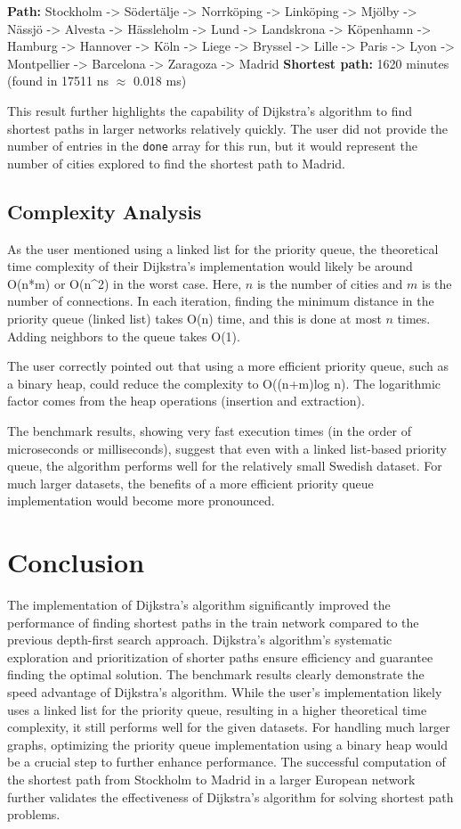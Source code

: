 \textbf{Path:} Stockholm -> Södertälje -> Norrköping -> Linköping -> Mjölby -> Nässjö -> Alvesta -> Hässleholm -> Lund -> Landskrona -> Köpenhamn -> Hamburg -> Hannover -> Köln -> Liege -> Bryssel -> Lille -> Paris -> Lyon -> Montpellier -> Barcelona -> Zaragoza -> Madrid
\textbf{Shortest path:} 1620 minutes (found in 17511 ns $\approx$ 0.018 ms)

This result further highlights the capability of Dijkstra's algorithm to find shortest paths in larger networks relatively quickly. The user did not provide the number of entries in the \texttt{done} array for this run, but it would represent the number of cities explored to find the shortest path to Madrid.

\subsection*{Complexity Analysis}
As the user mentioned using a linked list for the priority queue, the theoretical time complexity of their Dijkstra's implementation would likely be around O(n*m) or O(n^2) in the worst case. Here, $n$ is the number of cities and $m$ is the number of connections. In each iteration, finding the minimum distance in the priority queue (linked list) takes O(n) time, and this is done at most $n$ times. Adding neighbors to the queue takes O(1).

The user correctly pointed out that using a more efficient priority queue, such as a binary heap, could reduce the complexity to O((n+m)log n). The logarithmic factor comes from the heap operations (insertion and extraction).

The benchmark results, showing very fast execution times (in the order of microseconds or milliseconds), suggest that even with a linked list-based priority queue, the algorithm performs well for the relatively small Swedish dataset. For much larger datasets, the benefits of a more efficient priority queue implementation would become more pronounced.

\section*{Conclusion}
The implementation of Dijkstra's algorithm significantly improved the performance of finding shortest paths in the train network compared to the previous depth-first search approach. Dijkstra's algorithm's systematic exploration and prioritization of shorter paths ensure efficiency and guarantee finding the optimal solution. The benchmark results clearly demonstrate the speed advantage of Dijkstra's algorithm. While the user's implementation likely uses a linked list for the priority queue, resulting in a higher theoretical time complexity, it still performs well for the given datasets. For handling much larger graphs, optimizing the priority queue implementation using a binary heap would be a crucial step to further enhance performance. The successful computation of the shortest path from Stockholm to Madrid in a larger European network further validates the effectiveness of Dijkstra's algorithm for solving shortest path problems.
